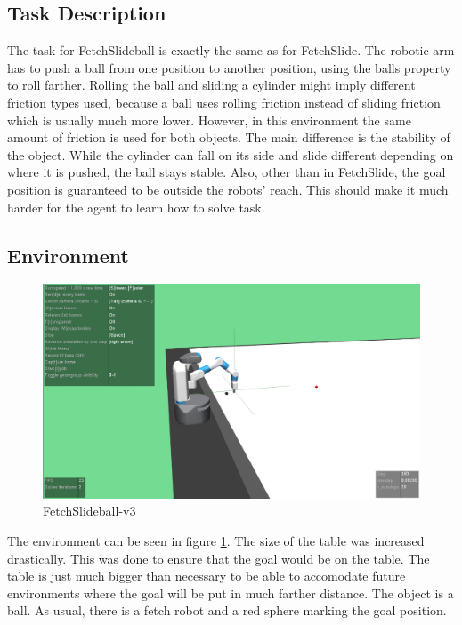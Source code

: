 \subsection{Task Description}

The task for FetchSlideball is exactly the same as for FetchSlide. The robotic arm has to push a ball from one position to another position, using the balls property to roll farther. Rolling the ball and sliding a cylinder might imply different friction types used, because a ball uses rolling friction instead of sliding friction which is usually much more lower. However, in this environment the same amount of friction is used for both objects. The main difference is the stability of the object. While the cylinder can fall on its side and slide different depending on where it is pushed, the ball stays stable. 
Also, other than in FetchSlide, the goal position is guaranteed to be outside the robots' reach. This should make it much harder for the agent to learn how to solve task.


\subsection{Environment}

\begin{figure} [!h]
	
	\centering
	\includegraphics[width=1\textwidth]{figures/FetchSlideball-v3.pdf}
	\caption{FetchSlideball-v3}
	\label{slideball1}
\end{figure}

The environment can be seen in figure \ref{slideball1}. The size of the table was increased drastically. This was done to ensure that the goal would be on the table. The table is just much bigger than necessary to be able to accomodate future environments where the goal will be put in much farther distance. The object is a ball. As usual, there is a fetch robot and a red sphere marking the goal position. 


